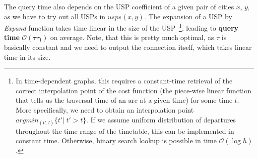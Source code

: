 		\begin{figure}[H]
		\centering
		\end{figure}	
	
	    \begin{figure}[H]
		\centering
		\end{figure}
		
		The query time also depends on the USP coefficient of a given pair of cities $x$, $y$, as we have to try out all USPs in $usps(x, y)$. The expansion of a USP by \textit{Expand} function takes time linear in the size of the USP~\footnote{In time-dependent graphs, this requires a constant-time retrieval of the correct interpolation point of the cost function (the piece-wise linear function that tells us the traversal time of an arc at a given time) for some time $t$. More specifically, we need to obtain an interpolation point $argmin_{(t', l)} \{t'| \; t' > t\}$. If we assume uniform distribution of departures throughout the time range of the timetable, this can be implemented in constant time. Otherwise, binary search lookup is possible in time $\mathcal{O}(\log h)$.}, leading to \textbf{query time} $\bm{\mathcal{O}(\tau \gamma)}$ on average. Note, that this is pretty much optimal, as $\tau$ is basically constant and we need to output the connection itself, which takes linear time in its size.
			
